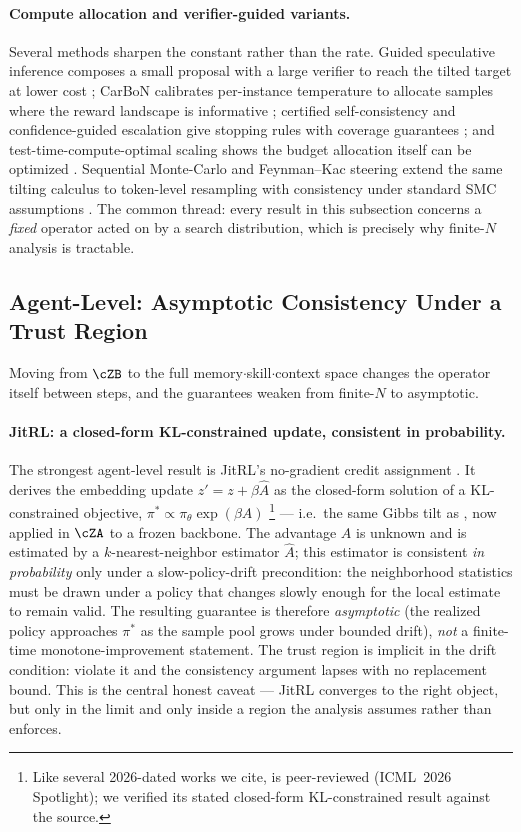 \paragraph{Compute allocation and verifier-guided variants.} Several methods sharpen the constant rather than the rate. Guided speculative inference composes a small proposal with a large verifier to reach the tilted target at lower cost \citep{geuter2025gsi}; CarBoN calibrates per-instance temperature to allocate samples where the reward landscape is informative \citep{carbon2025}; certified self-consistency and confidence-guided escalation give stopping rules with coverage guarantees \citep{certifiedsc2025,cges2025}; and test-time-compute-optimal scaling shows the budget allocation itself can be optimized \citep{snell2024ttscompute}. Sequential Monte-Carlo and Feynman--Kac steering extend the same tilting calculus to token-level resampling with consistency under standard SMC assumptions \citep{zhao2024twistedsmc,singhal2025fksteering}. The common thread: every result in this subsection concerns a \emph{fixed} operator acted on by a search distribution, which is precisely why finite-$N$ analysis is tractable.

\subsection{Agent-Level: Asymptotic Consistency Under a Trust Region}
\label{subsec:agent-level}

Moving from $\cZB$ to the full memory$\cdot$skill$\cdot$context space changes the operator itself between steps, and the guarantees weaken from finite-$N$ to asymptotic.

\paragraph{JitRL: a closed-form KL-constrained update, consistent in probability.} The strongest agent-level result is JitRL's no-gradient credit assignment \citep{jitrl2026}. It derives the embedding update $z' = z + \beta \hat{A}$ as the closed-form solution of a KL-constrained objective, $\pi^\ast \propto \pi_\theta \exp(\beta A)$ \citep{jitrl2026}\footnote{Like several 2026-dated works we cite, \citet{jitrl2026} is peer-reviewed (ICML~2026 Spotlight); we verified its stated closed-form KL-constrained result against the source.} — i.e.\ the same Gibbs tilt as , now applied in $\cZA$ to a frozen backbone. The advantage $A$ is unknown and is estimated by a $k$-nearest-neighbor estimator $\hat{A}$; this estimator is consistent \emph{in probability} only under a slow-policy-drift precondition: the neighborhood statistics must be drawn under a policy that changes slowly enough for the local estimate to remain valid. The resulting guarantee is therefore \emph{asymptotic} (the realized policy approaches $\pi^\ast$ as the sample pool grows under bounded drift), \emph{not} a finite-time monotone-improvement statement. The trust region is implicit in the drift condition: violate it and the consistency argument lapses with no replacement bound. This is the central honest caveat — JitRL converges to the right object, but only in the limit and only inside a region the analysis assumes rather than enforces.

